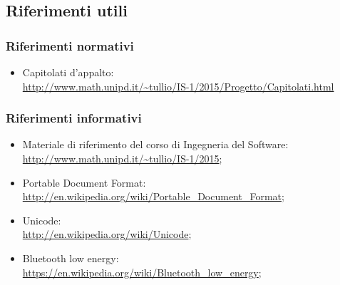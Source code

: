 \documentclass[../NormeProgetto.tex]{subfiles}
\begin{document}
	\subsection{Riferimenti utili}
		\subsubsection{Riferimenti normativi}
		\begin{itemize}
			\item Capitolati d'appalto: \\\url{http://www.math.unipd.it/~tullio/IS-1/2015/Progetto/Capitolati.html}
		\end{itemize}
		\subsubsection{Riferimenti informativi}
		\begin{itemize}
			\item Materiale di riferimento del corso di Ingegneria del Software: \\\url{http://www.math.unipd.it/~tullio/IS-1/2015};
			\item Portable Document Format:  \\\url{http://en.wikipedia.org/wiki/Portable_Document_Format};
			\item Unicode: \\\url{http://en.wikipedia.org/wiki/Unicode};
			\item Bluetooth low energy: \\\url{https://en.wikipedia.org/wiki/Bluetooth_low_energy};
		\end{itemize}
\end{document}

